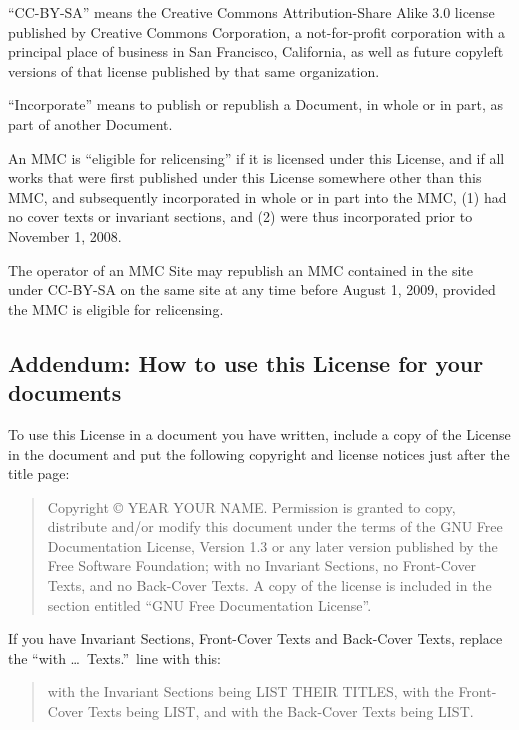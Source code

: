 \documentclass[letterpaper,twoside]{scrartcl}
\begin{document}
   ``CC-BY-SA'' means the Creative Commons Attribution-Share Alike 3.0
   license published by Creative Commons Corporation, a not-for-profit
   corporation with a principal place of business in San Francisco,
   California, as well as future copyleft versions of that license
   published by that same organization.

   ``Incorporate'' means to publish or republish a Document, in whole or
   in part, as part of another Document.

   An MMC is ``eligible for relicensing'' if it is licensed under this
   License, and if all works that were first published under this License
   somewhere other than this MMC, and subsequently incorporated in whole
   or in part into the MMC, (1) had no cover texts or invariant sections,
   and (2) were thus incorporated prior to November 1, 2008.

   The operator of an MMC Site may republish an MMC contained in the site
   under CC-BY-SA on the same site at any time before August 1, 2009,
   provided the MMC is eligible for relicensing.


   
   
   \subsection{Addendum: How to use this License for your documents}
   

   To use this License in a document you have written, include a copy of
   the License in the document and put the following copyright and
   license notices just after the title page:

   \bigskip
   \begin{quote}
    Copyright \copyright{}  YEAR  YOUR NAME.
    Permission is granted to copy, distribute and/or modify this document
    under the terms of the GNU Free Documentation License, Version 1.3
    or any later version published by the Free Software Foundation;
    with no Invariant Sections, no Front-Cover Texts, and no Back-Cover Texts.
    A copy of the license is included in the section entitled ``GNU
    Free Documentation License''.
   \end{quote}
   \newpage


   If you have Invariant Sections, Front-Cover Texts and Back-Cover Texts,
   replace the ``with \dots\ Texts.''\ line with this:

   \bigskip
   \begin{quote}
    with the Invariant Sections being LIST THEIR TITLES, with the
    Front-Cover Texts being LIST, and with the Back-Cover Texts being LIST.
   \end{quote}
   \bigskip
 		  
\end{document}
